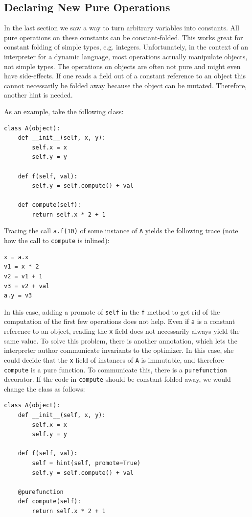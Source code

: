 \documentclass{sigplanconf}
\begin{document}
\subsection{Declaring New Pure Operations}

In the last section we saw a way to turn arbitrary variables into constants. All
pure operations on these constants can be constant-folded. This works great for
constant folding of simple types, e.g. integers. Unfortunately, in the context of an
interpreter for a dynamic
language, most operations actually manipulate objects, not simple types. The
operations on objects are often not pure and might even have side-effects. If
one reads a field out of a constant reference to an object this cannot
necessarily be folded away because the object can be mutated. Therefore, another
hint is needed.

As an example, take the following class:

\begin{lstlisting}[mathescape,basicstyle=\ttfamily]
class A(object):
    def __init__(self, x, y):
        self.x = x
        self.y = y

    def f(self, val):
        self.y = self.compute() + val

    def compute(self):
        return self.x * 2 + 1
\end{lstlisting}

Tracing the call \texttt{a.f(10)} of some instance of \texttt{A} yields the following
trace (note how the call to \texttt{compute} is inlined):
%
\begin{lstlisting}[mathescape,basicstyle=\ttfamily]
x = a.x
v1 = x * 2
v2 = v1 + 1
v3 = v2 + val
a.y = v3
\end{lstlisting}

In this case, adding a promote of \texttt{self} in the \texttt{f} method to get rid of the
computation of the first few operations does not help. Even if \texttt{a} is a
constant reference to an object, reading the \texttt{x} field does not necessarily
always yield the same value. To solve this problem, there is another annotation,
which lets the interpreter author communicate invariants to the optimizer. In
this case, she could decide that the \texttt{x} field of instances of \texttt{A} is
immutable, and therefore \texttt{compute}
is a pure function. To communicate this, there is a \texttt{purefunction} decorator.
If the code in \texttt{compute} should be constant-folded away, we would change the
class as follows:
\begin{lstlisting}[mathescape,basicstyle=\ttfamily]
class A(object):
    def __init__(self, x, y):
        self.x = x
        self.y = y

    def f(self, val):
        self = hint(self, promote=True)
        self.y = self.compute() + val

    @purefunction
    def compute(self):
        return self.x * 2 + 1
\end{lstlisting}
\end{document}
